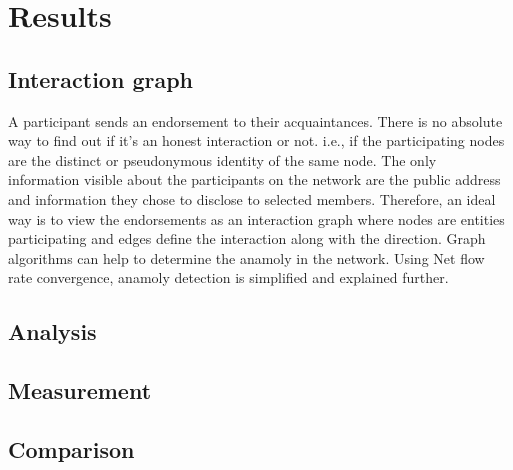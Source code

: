 \chapter{Results} \label{ch:results}


\section{Interaction graph}

A participant sends an endorsement to their acquaintances. There is no absolute
way to find out if it's an honest interaction or not. i.e., if the
participating nodes are the distinct or pseudonymous identity of the same node.
The only information visible about the participants on the network are the
public address and information they chose to disclose to selected members.
Therefore, an ideal way is to view the endorsements as an interaction graph
where nodes are entities participating and edges define the interaction along
with the direction. Graph algorithms can help to determine the anamoly in the
network. Using Net flow rate convergence, anamoly detection is simplified and
explained further. 


\section{Analysis}
\section{Measurement}
\section{Comparison}


